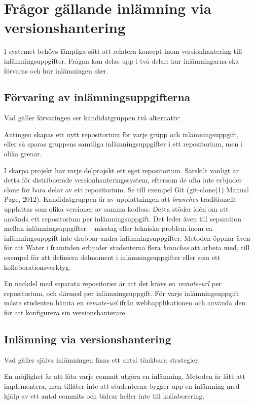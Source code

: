 \section{Frågor gällande inlämning via versionshantering}\label{sec:fragor-git}
I systemet behövs lämpliga sätt att relatera koncept inom versionhantering till inlämningsuppgifter. Frågan kan delas upp i två delar: hur inlämningarna ska förvaras och hur inlämningen sker.

\subsection{Förvaring av inlämningsuppgifterna}
Vad gäller förvaringen ser kandidatgruppen två alternativ:

Antingen skapas ett nytt repositorium för varje grupp och inlämningsuppgift, eller så sparas gruppens samtliga inlämningsuppgifter i ett repositorium, men i olika grenar.

I skarpa projekt har varje delprojekt ett eget repositorium. Särskilt vanligt är detta för distribuerade versionhanteringssystem, eftersom de ofta inte erbjuder clone för bara delar av ett repositorium. Se till exempel Git (git-clone(1) Manual Page, 2012). Kandidatgruppen är av uppfattningen att \emph{branches} traditionellt uppfattas som olika versioner av samma kodbas. Detta stöder idén om att använda ett repositorium per inlämningsuppgift. Det leder även till separation mellan inlämningsuppgifter – misstag eller tekniska problem inom en inlämningsuppgift inte drabbar andra inlämningsuppgifter. Metoden öppnar även för att Water i framtiden erbjuder studenterna flera \emph{branches} att arbeta med, till exempel för att definiera delmoment i inlämningsuppgifter eller som ett kollaborationsverktyg.

En nackdel med separata repositorier är att det krävs en \emph{remote-url} per repositorium, och därmed per inlämningsuppgift. För varje inlämningsuppgift måste studenten hämta en \emph{remote-url} ifrån webbapplikationen och använda den för att konfigurera sin versionshanterare.

\subsection{Inlämning via versionshantering}
Vad gäller själva inlämningen finns ett antal tänkbara strategier.

En möjlighet är att låta varje commit utgöra en inlämning. Metoden är lätt att implementera, men tillåter inte att studenterna bygger upp en inlämning med hjälp av ett antal commits och bidrar heller inte till kollaborering.

